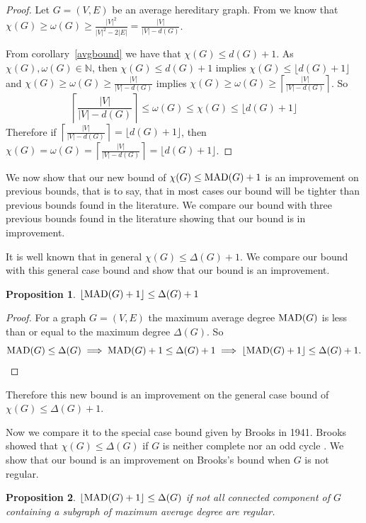 \documentclass{article}
\newcommand{\MAD}{\ensuremath{\text{\textit{MAD}}}}
\newtheorem{proposition}{Proposition}
\begin{document}
\begin{proof}
    Let $G = (V,E)$ be an average hereditary graph. From \cite{4} we know that $\chi(G) \geq\omega(G)\geq\frac{|V|^2}{|V|^2-2|E|} = \frac{|V|}{|V| - d(G)}$.
    
    From corollary~\ref{avgbound} we have that $\chi(G) \leq d(G)+1$. As $\chi(G),\omega(G) \in \mathbb{N}$, then $\chi(G) \leq d(G)+1$ implies $\chi(G) \leq \lfloor d(G)+1 \rfloor$ and $\chi(G) \geq\omega(G) \geq \frac{|V|}{|V| - d(G)}$ implies $\chi(G) \geq \omega(G) \geq\left\lceil\frac{|V|}{|V|-d(G)} \right\rceil$. So 
    $$ \left\lceil\frac{|V|}{|V|-d(G)} \right\rceil \leq\omega(G) \leq \chi(G) \leq \lfloor d(G)+1 \rfloor$$ 
    Therefore if $\left\lceil\frac{|V|}{|V|-d(G)} \right\rceil = \lfloor d(G)+1 \rfloor$, then $\chi(G) = \omega(G) = \left\lceil\frac{|V|}{|V|-d(G)} \right\rceil = \lfloor d(G)+1 \rfloor$.
\end{proof}
We now show that our new bound of $\chi(G) \leq \MAD(G)+1$ is an improvement on previous bounds, that is to say, that in most cases our bound will be tighter than previous bounds found in the literature. We compare our bound with three previous bounds found in the literature showing that our bound is in improvement.

It is well known that in general $\chi(G) \leq \Delta(G) + 1$. We compare our bound with this general case bound and show that our bound is an improvement.

\begin{proposition}\label{improv1}
    $\lfloor \MAD(G)+1 \rfloor \leq \Delta(G) + 1$
\end{proposition}

\begin{proof}
    For a graph $G = (V,E)$ the maximum average degree $\MAD(G)$ is less than or equal to the maximum degree $\Delta(G)$. So
    $$\MAD(G) \leq \Delta(G) \implies \MAD(G)+1\leq \Delta(G) + 1 \implies \lfloor \MAD(G)+1 \rfloor \leq \Delta(G) + 1.$$
\end{proof}

Therefore this new bound is an improvement on the general case bound of $\chi(G) \leq \Delta(G) + 1$.

Now we compare it to the special case bound given by Brooks in 1941. Brooks showed that $\chi(G) \leq \Delta(G)$ if $G$ is neither complete nor an odd cycle \cite{7}. We show that our bound is an improvement on Brooks's bound when $G$ is not regular.

\begin{proposition}\label{improv2}
    $\lfloor \MAD(G)+1 \rfloor \leq \Delta(G)$ if not all connected component of $G$ containing a subgraph of maximum average degree are regular. 
\end{proposition}
\end{document}
